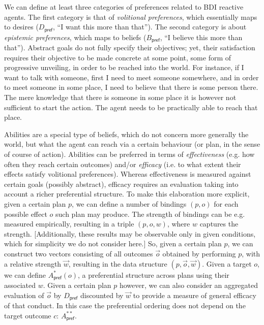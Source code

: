 \documentclass[sigconf,anonymous]{aamas}
\begin{document}
We can define at least three categories of preferences related to BDI reactive agents. The first category is that of \textit{volitional preferences}, which essentially maps to desires ($D_{\mathsf{pref}}$, ``I want this more than that''). The second category is about \textit{epistemic preferences}, which maps to beliefs ($B_{\mathsf{pref}}$, ``I believe this more than that''). Abstract goals do not fully specify their objectives; yet, their satisfaction requires their objective to be made concrete at some point, some form of progressive unveiling, in order to be reached into the world. For instance, if I want to talk with someone, first I need to meet someone somewhere, and in order to meet someone in some place, I need to believe that there is some person there. The mere knowledge that there is someone in some place it is however not sufficient to start the action. The agent needs to be practically able to reach that place. 

Abilities are a special type of beliefs, which do not concern more generally the world, but what the agent can reach via a certain behaviour (or plan, in the sense of course of action). Abilities can be preferred in terms of \textit{effectiveness} (e.g. how often they reach certain outcomes) and/or \textit{efficacy} (i.e. to what extent their effects satisfy volitional preferences). Whereas effectiveness is measured against certain goals (possibly abstract), efficacy requires an evaluation taking into account a richer preferential structure. To make this elaboration more explicit, given a certain plan $p$, we can define a number of bindings $(p, o)$ for each possible effect $o$ such plan may produce. The strength of bindings can be  e.g. measured empirically, resulting in a triple $(p, o, w)$, where $w$ captures the strength. [Additionally, these results may be observable only in given conditions, which for simplicity we do not consider here.] So, given a certain plan $p$, we can construct two vectors consisting of all outcomes $\vec{o}$ obtained by performing $p$, with a relative strength $\vec{w}$, resulting in the data structure $(p, \vec{o}, \vec{w})$. Given a target $o$, we can define  $A^*_{\mathsf{pref}}(o)$, a preferential structure across plans using their associated $w$. Given a certain plan $p$ however, we can also consider an aggregated evaluation of $\vec{o}$ by $D_\mathsf{pref}$ discounted by $
\vec{w}$ to provide a measure of general efficacy of that conduct. In this case the preferential ordering does not depend on the target outcome $c$: $A_{\mathsf{pref}}^{**}$.
\end{document}
